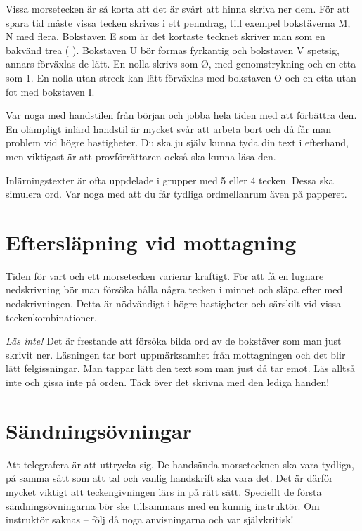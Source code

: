 Vissa morsetecken är så korta att det är svårt att hinna skriva ner dem.
För att spara tid måste vissa tecken skrivas i ett penndrag, till exempel
bokstäverna M, N med flera.
Bokstaven E som är det kortaste tecknet skriver man som en bakvänd trea
(  ).
Bokstaven U bör formas fyrkantig och bokstaven V spetsig, annars förväxlas de
lätt.
En nolla skrivs som Ø, med genomstrykning och en etta som 1.
En nolla utan streck kan lätt förväxlas med bokstaven O och en etta utan fot med
bokstaven I.

Var noga med handstilen från början och jobba hela tiden med att förbättra den.
En olämpligt inlärd handstil är mycket svår att arbeta bort och då får man
problem vid högre hastigheter.
Du ska ju själv kunna tyda din text i efterhand, men viktigast är att
provförrättaren också ska kunna läsa den.

Inlärningstexter är ofta uppdelade i grupper med 5 eller 4 tecken.
Dessa ska simulera ord.
Var noga med att du får tydliga ordmellanrum även på papperet.

\section[Eftersläpning]{Eftersläpning vid mottagning}

Tiden för vart och ett morsetecken varierar kraftigt.
För att få en lugnare nedskrivning bör man försöka hålla några tecken i minnet
och släpa efter med nedskrivningen.
Detta är nödvändigt i högre hastigheter och särskilt vid vissa
teckenkombinationer.

\emph{Läs inte!}
Det är frestande att försöka bilda ord av de bokstäver som man just skrivit ner.
Läsningen tar bort uppmärksamhet från mottagningen och det blir lätt
felgissningar.
Man tappar lätt den text som man just då tar emot.
Läs alltså inte och gissa inte på orden.
Täck över det skrivna med den lediga handen!

\section{Sändningsövningar}

Att telegrafera är att uttrycka sig.
De handsända morsetecknen ska vara tydliga, på samma sätt som att tal och
vanlig handskrift ska vara det.
Det är därför mycket viktigt att teckengivningen lärs in på rätt sätt.
Speciellt de första sändningsövningarna bör ske tillsammans med en kunnig
instruktör.
Om instruktör saknas -- följ då noga anvisningarna och var självkritisk!

